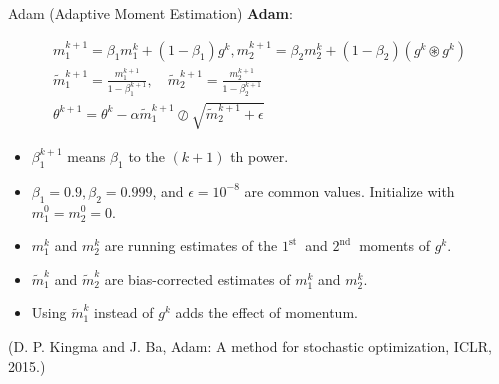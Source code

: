 \begin{frame}[allowframebreaks]

\begin{mydefinitionblock}{6.21}{Adam (Adaptive Moment Estimation)}
    \textbf{Adam}:

    $$
    \begin{gathered}
    m_{1}^{k+1}=\beta_{1} m_{1}^{k}+\left(1-\beta_{1}\right) g^{k}, m_{2}^{k+1}=\beta_{2} m_{2}^{k}+\left(1-\beta_{2}\right)\left(g^{k} \circledast g^{k}\right) \\
    \tilde{m}_{1}^{k+1}=\frac{m_{1}^{k+1}}{1-\beta_{1}^{k+1}}, \quad \widetilde{m}_{2}^{k+1}=\frac{m_{2}^{k+1}}{1-\beta_{2}^{k+1}} \\
    \theta^{k+1}=\theta^{k}-\alpha \widetilde{m}_{1}^{k+1} \oslash \sqrt{\widetilde{m}_{2}^{k+1}+\epsilon}
    \end{gathered}
    $$

    \begin{itemize}
        \item $\beta_{1}^{k+1}$ means $\beta_{1}$ to the $(k+1)$ th power.
        \item $\beta_{1}=0.9, \beta_{2}=0.999$, and $\epsilon=10^{-8}$ are common values. Initialize with $m_{1}^{0}=m_{2}^{0}=0$.
        \item $m_{1}^{k}$ and $m_{2}^{k}$ are running estimates of the $1^{\text {st }}$ and $2^{\text {nd }}$ moments of $g^{k}$.
        \item $\tilde{m}_{1}^{k}$ and $\tilde{m}_{2}^{k}$ are bias-corrected estimates of $m_{1}^{k}$ and $m_{2}^{k}$.
        \item Using $\widetilde{m}_{1}^{k}$ instead of $g^{k}$ adds the effect of momentum.
    \end{itemize}

    (D. P. Kingma and J. Ba, Adam: A method for stochastic optimization, ICLR, 2015.)
\end{mydefinitionblock}

\end{frame}


